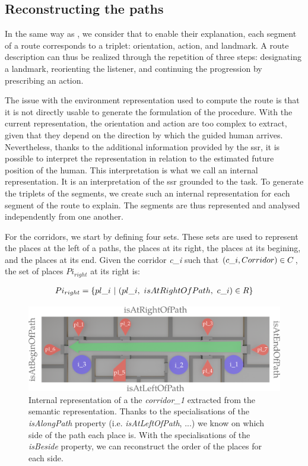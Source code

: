 \subsection{Reconstructing the paths}

In the same way as \cite{tversky_1999_pictorial}, we consider that to enable their explanation, each segment of a route corresponds to a triplet: orientation, action, and landmark. A route description can thus be realized through the repetition of three steps: designating a landmark, reorienting the listener, and continuing the progression by prescribing an action.

The issue with the environment representation used to compute the route is that it is not directly usable to generate the formulation of the procedure. With the current representation, the orientation and action are too complex to extract, given that they depend on the direction by which the guided human arrives. Nevertheless, thanks to the additional information provided by the \acrlong{ssr}, it is possible to interpret the representation in relation to the estimated future position of the human. This interpretation is what we call an internal representation. It is an interpretation of the \acrshort{ssr} grounded to the task. To generate the triplets of the segments, we create such an internal representation for each segment of the route to explain. The segments are thus represented and analysed independently from one another.

For the corridors, we start by defining four sets. These sets are used to represent the places at the left of a paths, the places at its right, the places at its begining, and the places at its end. Given the corridor \textit{c\_i} such that $(c\_i, Corridor) \in C$, the set of places $Pi_{right}$ at its right is:

\begin{gather*}
Pi_{right} = \{ pl\_i\ |\ (pl\_i,\ isAtRightOfPath,\ c\_i) \in R \}
\end{gather*}

\begin{figure}[h!]
\centering
\includegraphics[width=\textwidth]{figures/chapter3/corridor.png}
\caption{\label{fig:chap3_corridor} Internal representation of a the \textit{corridor\_1} extracted from the semantic representation. Thanks to the specialisations of the \textit{isAlongPath} property (i.e. \textit{isAtLeftOfPath}, ...) we know on which side of the path each place is. With the specialisations of the \textit{isBeside} property, we can reconstruct the order of the places for each side. }
\end{figure}


